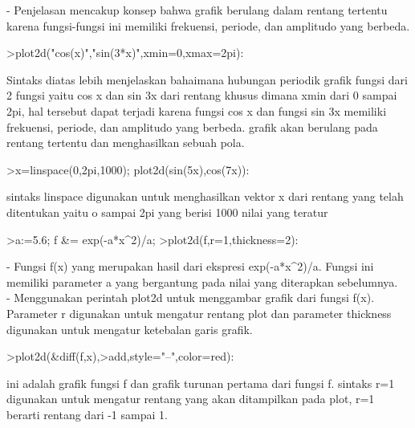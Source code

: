 \documentclass[a4paper,10pt]{article}
\begin{document}
\begin{eulernotebook}
\begin{eulercomment}
\begin{eulercomment}
\begin{eulerttcomment}
\end{eulerttcomment}
\begin{eulercomment}
- Penjelasan mencakup konsep bahwa grafik berulang dalam rentang
tertentu karena fungsi-fungsi ini memiliki frekuensi, periode, dan
amplitudo yang berbeda.
\end{eulercomment}
\begin{eulerprompt}
>plot2d("cos(x)","sin(3*x)",xmin=0,xmax=2pi):
\end{eulerprompt}
\begin{eulercomment}
Sintaks diatas lebih menjelaskan bahaimana hubungan periodik grafik
fungsi dari 2 fungsi yaitu cos x dan sin 3x dari rentang khusus dimana
xmin dari 0 sampai 2pi, hal tersebut dapat terjadi karena fungsi cos x
dan fungsi sin 3x memiliki frekuensi, periode, dan amplitudo yang
berbeda. grafik akan berulang pada rentang tertentu dan menghasilkan
sebuah pola.
\end{eulercomment}
\begin{eulerprompt}
>x=linspace(0,2pi,1000); plot2d(sin(5x),cos(7x)):
\end{eulerprompt}
\begin{eulercomment}
sintaks linspace digunakan untuk menghasilkan vektor x dari rentang
yang telah ditentukan yaitu o sampai 2pi yang berisi 1000 nilai yang
teratur
\end{eulercomment}
\begin{eulerprompt}
>a:=5.6; f &= exp(-a*x^2)/a;
>plot2d(f,r=1,thickness=2):
\end{eulerprompt}
\begin{eulercomment}
- Fungsi f(x) yang merupakan hasil dari ekspresi exp(-a*x\textasciicircum{}2)/a. Fungsi
ini memiliki parameter a yang bergantung pada nilai yang diterapkan
sebelumnya.\\
- Menggunakan perintah plot2d untuk menggambar grafik dari fungsi
f(x).\\
Parameter r digunakan untuk mengatur rentang plot dan parameter
thickness digunakan untuk mengatur ketebalan garis grafik.
\end{eulercomment}
\begin{eulerprompt}
>plot2d(&diff(f,x),>add,style="--",color=red):
\end{eulerprompt}
\begin{eulercomment}
ini adalah grafik fungsi f dan grafik turunan pertama dari fungsi f.
sintaks r=1 digunakan untuk mengatur rentang yang akan ditampilkan
pada plot, r=1 berarti rentang dari -1 sampai 1.\\

\end{eulercomment}
\end{eulercomment}
\end{eulercomment}
\end{eulernotebook}
\end{document}
